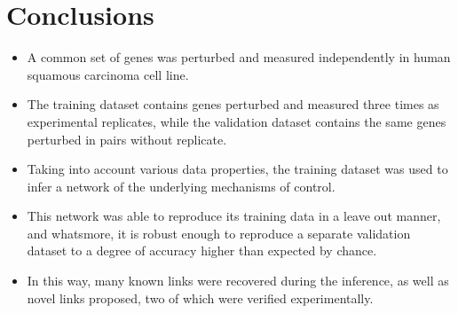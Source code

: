 \documentclass[a0,portrait]{a0poster}
\begin{document}
\section*{Conclusions}

\begin{itemize}
\item A common set of genes was perturbed and measured independently in human squamous carcinoma cell line. 
\item The training dataset contains genes perturbed and measured three times as experimental replicates, while the validation dataset contains the same genes perturbed in pairs without replicate. 
\item Taking into account various data properties, the training dataset was used to infer a network of the underlying mechanisms of control. 
\item This network was able to reproduce its training data in a leave out manner, and whatsmore, it is robust enough to reproduce a separate validation dataset to a degree of accuracy higher than expected by chance. 
\item In this way, many known links were recovered during the inference, as well as novel links proposed, two of which were verified experimentally.
\end{itemize}

\color{DarkSlateGray}
 
\small  
\end{document}

